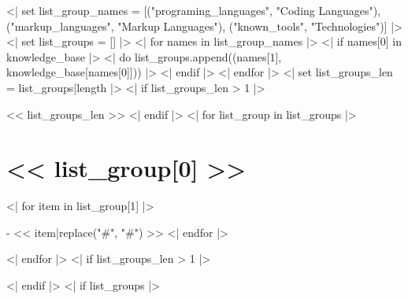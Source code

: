 \documentclass[10pt, letterpaper]{article}
\begin{document}
    <| set list_group_names = [("programing_languages", "Coding Languages"),
                               ("markup_languages", "Markup Languages"),
                               ("known_tools", "Technologies")] |>
    <| set list_groups = [] |>
    <| for names in list_group_names |>
        <| if names[0] in knowledge_base |>
            <| do list_groups.append((names[1], knowledge_base[names[0]])) |>
        <| endif |>
    <| endfor |>
    <| set list_groups_len = list_groups|length |>
    <| if list_groups_len > 1 |>
        \begin{multicols}{<< list_groups_len >>}
        \raggedcolumns
    <| endif |>
    <| for list_group in list_groups |>
        \section{<< list_group[0] >>}
        \parbox{\columnwidth}{
            \begin{itemize*}
                <| for item in list_group[1] |>
                    \item[-] << item|replace("#", "\#") >>
                <| endfor |>
            \end{itemize*}\vfill
        }\columnbreak
    <| endfor |>
    <| if list_groups_len > 1 |>
        \end{multicols}
    <| endif |>
    <| if list_groups |>
    
\end{document}
